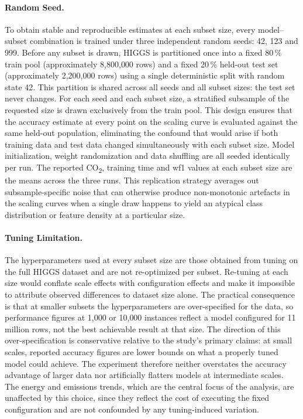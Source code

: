 \paragraph{Random Seed.}
To obtain stable and reproducible estimates at each subset size, every model--subset combination is trained under three independent random seeds: 42, 123 and 999. Before any subset is drawn, HIGGS is partitioned once into a fixed 80\,\% train pool (approximately 8{,}800{,}000 rows) and a fixed 20\,\% held-out test set (approximately 2{,}200{,}000 rows) using a single deterministic split with random state 42. This partition is shared across all seeds and all subset sizes: the test set never changes. For each seed and each subset size, a stratified subsample of the requested size is drawn exclusively from the train pool. This design ensures that the accuracy estimate at every point on the scaling curve is evaluated against the same held-out population, eliminating the confound that would arise if both training data and test data changed simultaneously with each subset size. Model initialization, weight randomization and data shuffling are all seeded identically per run. The reported CO\textsubscript{2}, training time and \gls{wf1} values at each subset size are the means across the three runs. This replication strategy averages out subsample-specific noise that can otherwise produce non-monotonic artefacts in the scaling curves when a single draw happens to yield an atypical class distribution or feature density at a particular size.

\paragraph{Tuning Limitation.}
The hyperparameters used at every subset size are those obtained from tuning on the full HIGGS dataset and are not re-optimized per subset. Re-tuning at each size would conflate scale effects with configuration effects and make it impossible to attribute observed differences to dataset size alone. The practical consequence is that at smaller subsets the hyperparameters are over-specified for the data, so performance figures at 1{,}000 or 10{,}000 instances reflect a model configured for 11 million rows, not the best achievable result at that size. The direction of this over-specification is conservative relative to the study's primary claims: at small scales, reported accuracy figures are lower bounds on what a properly tuned model could achieve. The experiment therefore neither overstates the accuracy advantage of larger data nor artificially flatters models at intermediate scales. The energy and emissions trends, which are the central focus of the analysis, are unaffected by this choice, since they reflect the cost of executing the fixed configuration and are not confounded by any tuning-induced variation.


